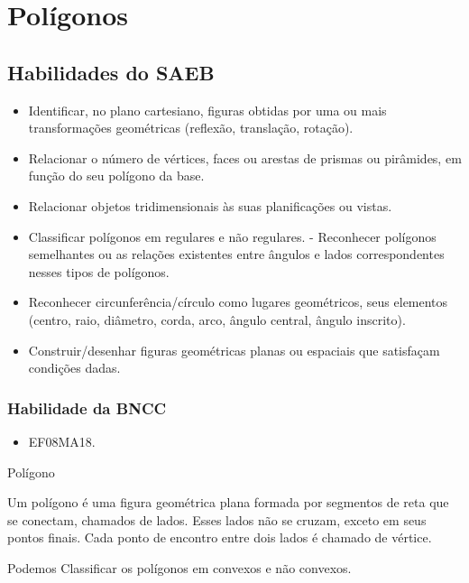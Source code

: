

\chapter{Polígonos}

\section{Habilidades do SAEB}

\begin{itemize}
\item Identificar, no plano cartesiano, figuras obtidas
por uma ou mais transformações geométricas (reflexão, translação,
rotação).
\item
  Relacionar o número de vértices, faces ou arestas de prismas ou
  pirâmides, em função do seu polígono da base.
\item
  Relacionar objetos tridimensionais às suas planificações ou vistas.
\item
  Classificar polígonos em regulares e não regulares. - Reconhecer
  polígonos semelhantes ou as relações existentes entre ângulos e lados
  correspondentes nesses tipos de polígonos.
\item
  Reconhecer circunferência/círculo como lugares geométricos, seus
  elementos (centro, raio, diâmetro, corda, arco, ângulo central, ângulo
  inscrito).
\item
  Construir/desenhar figuras geométricas planas ou espaciais que
  satisfaçam condições dadas.
\end{itemize}

\subsection{Habilidade da BNCC}

\begin{itemize}
\item EF08MA18.
\end{itemize}

Polígono

Um polígono é uma figura geométrica plana formada por segmentos de reta
que se conectam, chamados de lados. Esses lados não se cruzam, exceto em
seus pontos finais. Cada ponto de encontro entre dois lados é chamado de
vértice.

Podemos Classificar os polígonos em convexos e não convexos.

